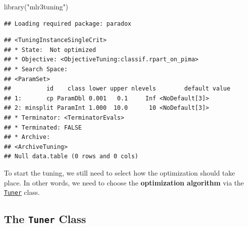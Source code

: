 \documentclass[
]{scrbook}
\newenvironment{Shaded}{\begin{snugshade}}{\end{snugshade}}
\newcommand{\AttributeTok}[1]{\textcolor[rgb]{0.77,0.63,0.00}{#1}}
\newcommand{\DecValTok}[1]{\textcolor[rgb]{0.00,0.00,0.81}{#1}}
\newcommand{\FunctionTok}[1]{\textcolor[rgb]{0.00,0.00,0.00}{#1}}
\newcommand{\NormalTok}[1]{#1}
\newcommand{\OtherTok}[1]{\textcolor[rgb]{0.56,0.35,0.01}{#1}}
\newcommand{\SpecialCharTok}[1]{\textcolor[rgb]{0.00,0.00,0.00}{#1}}
\newcommand{\StringTok}[1]{\textcolor[rgb]{0.31,0.60,0.02}{#1}}
\renewenvironment{Shaded} {\begin{snugshade}\small} {\end{snugshade}}
\begin{document}
\begin{Shaded}
\begin{Highlighting}[]
\FunctionTok{library}\NormalTok{(}\StringTok{"mlr3tuning"}\NormalTok{)}
\end{Highlighting}
\end{Shaded}

\begin{verbatim}
## Loading required package: paradox
\end{verbatim}

\begin{Shaded}
\end{Shaded}

\begin{verbatim}
## <TuningInstanceSingleCrit>
## * State:  Not optimized
## * Objective: <ObjectiveTuning:classif.rpart_on_pima>
## * Search Space:
## <ParamSet>
##          id    class lower upper nlevels        default value
## 1:       cp ParamDbl 0.001   0.1     Inf <NoDefault[3]>      
## 2: minsplit ParamInt 1.000  10.0      10 <NoDefault[3]>      
## * Terminator: <TerminatorEvals>
## * Terminated: FALSE
## * Archive:
## <ArchiveTuning>
## Null data.table (0 rows and 0 cols)
\end{verbatim}

To start the tuning, we still need to select how the optimization should take place.
In other words, we need to choose the \textbf{optimization algorithm} via the \href{https://mlr3tuning.mlr-org.com/reference/Tuner.html}{\texttt{Tuner}} class.

\hypertarget{tuning-algorithms}{%
\subsection{\texorpdfstring{The \texttt{Tuner} Class}{The Tuner Class}}\label{tuning-algorithms}}
\end{document}
